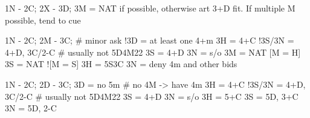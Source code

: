 1N - 2C; 2X - 3D;
3M = NAT if possible, otherwise art 3+D fit. If multiple M possible, tend to cue

1N - 2C; 2M - 3C;  # minor ask
!3D = at least one 4+m
    3H = 4+C
        !3S/3N = 4+D, 3C/2-C  # usually not 5D4M22
    3S = 4+D
    3N = s/o
3M = NAT
[M = H] 3S = NAT
![M = S] 3H = 5S3C
3N = deny 4m and other bids

1N - 2C; 2D - 3C;
3D = no 5m  # no 4M -> have 4m
    3H = 4+C
        !3S/3N = 4+D, 3C/2-C  # usually not 5D4M22
    3S = 4+D
    3N = s/o
3H = 5+C
3S = 5D, 3+C
3N = 5D, 2-C